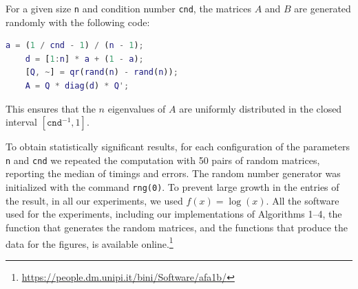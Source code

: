 \documentclass[DIV=14]{scrartcl}
\theoremstyle{thmstyletwo}
\theoremstyle{definition}
\numberwithin{equation}{section}
\begin{document}
{For a given size \texttt{n} and condition number \texttt{cnd}, the matrices $A$ and $B$ are generated randomly with the following code:
\begin{lstlisting}[language=matlab]
    a = (1 / cnd - 1) / (n - 1);
    d = [1:n] * a + (1 - a);
    [Q, ~] = qr(rand(n) - rand(n));
    A = Q * diag(d) * Q';
\end{lstlisting}
This ensures that the $n$ eigenvalues of $A$ are uniformly distributed in the closed interval $[\texttt{cnd}^{-1}, 1]$.

To obtain statistically significant results, for each configuration of the parameters
\texttt{n} and \texttt{cnd} we repeated the computation with 50 pairs of random matrices,
reporting the median of timings and errors. The random number generator was initialized with the command \texttt{rng(0)}.
To prevent large growth in the entries of the result, in all our experiments, we used $f(x) = \log(x)$.
All the software used for the experiments, including our implementations of Algorithms 1--4, the function that generates the random matrices, and the functions that produce the data for the figures, is available online.\footnote{\url{https://people.dm.unipi.it/bini/Software/afa1b/}}

}
\end{document}
